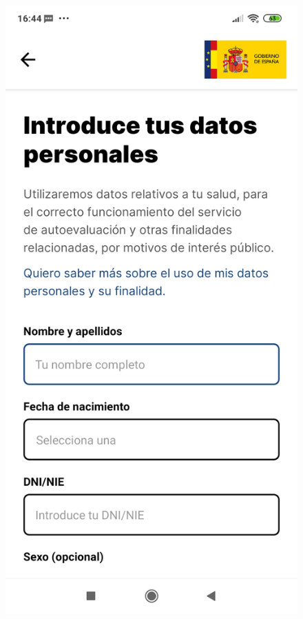 \documentclass[a4paper, 12pt]{article}
\begin{document}
\begin{figure}[!htb]
   \begin{minipage}{0.33\textwidth}
     \centering
     \includegraphics[scale=0.06]{images/discussion/asistencia-covid-1.jpg}

\end{minipage}
\end{figure}
\end{document}
